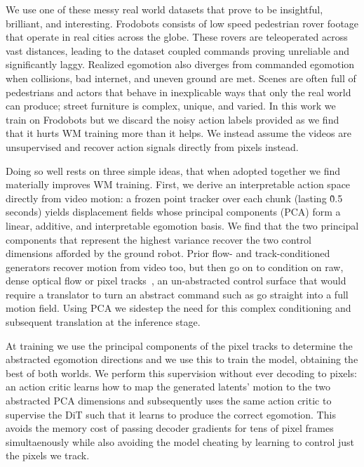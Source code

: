 \documentclass[letterpaper]{article} %
\begin{document}
We use one of these messy real world datasets that prove to be insightful, brilliant, and interesting. Frodobots \cite{frodobots} consists of low speed pedestrian rover footage that operate in real cities across the globe. These rovers are teleoperated across vast distances, leading to the dataset coupled commands proving unreliable and significantly laggy. Realized egomotion also diverges from commanded egomotion when collisions, bad internet, and uneven ground are met. Scenes are often full of pedestrians and actors that behave in inexplicable ways that only the real world can produce; street furniture is complex, unique, and varied. In this work we train on Frodobots but we discard the noisy action labels provided as we find that it hurts WM training more than it helps. We instead assume the videos are unsupervised and recover action signals directly from pixels instead.

Doing so well rests on three simple ideas, that when adopted together we find materially improves WM training. First, we derive an interpretable action space directly from video motion: a frozen point tracker \cite{cotracker} over each chunk (lasting \~0.5 seconds) yields displacement fields whose principal components (PCA) form a linear, additive, and interpretable egomotion basis. We find that the two principal components that represent the highest variance recover the two control dimensions afforded by the ground robot. Prior flow- and track-conditioned generators recover motion from video too, but then go on to condition on raw, dense optical flow or pixel tracks~\cite{flovd, motionprompting, onlyflow}, an un-abstracted control surface that would require a translator to turn an abstract command such as go straight into a full motion field. Using PCA we sidestep the need for this complex conditioning and subsequent translation at the inference stage. 

At training we use the principal components of the pixel tracks to determine the abstracted egomotion directions and we use this to train the model, obtaining the best of both worlds. We perform this supervision without ever decoding to pixels: an action critic learns how to map the generated latents' motion to the two abstracted PCA dimensions and subsequently uses the same action critic to supervise the DiT such that it learns to produce the correct egomotion. This avoids the memory cost of passing decoder gradients for tens of pixel frames simultaenously while also avoiding the model cheating by learning to control just the pixels we track. 
\end{document}

